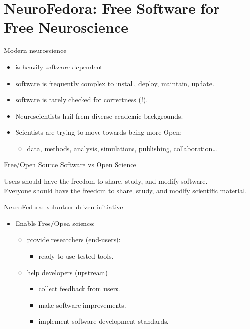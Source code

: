 \section{NeuroFedora: Free Software for Free Neuroscience}
\begin{frame}[c]{Modern neuroscience}
  \begin{itemize}
    \item is \alert{heavily software dependent}.
    \item software is frequently \alert{complex} to install, deploy, maintain, update.
    \item software is \alert{rarely checked for correctness (!)}.
      \pause{}
    \item Neuroscientists hail from \alert{diverse academic backgrounds}.
      \pause{}
    \item Scientists are trying to move towards being more \alert{Open}:
      \begin{itemize}
        \item data, methods, analysis, simulations, publishing, collaboration\ldots{}
      \end{itemize}
  \end{itemize}
\end{frame}
\begin{frame}[c]{Free/Open Source Software vs Open Science}
  \begin{center}
    Users should have the freedom to \alert{share, study, and modify} software\footnotemark[1].\\
    \vspace{1cm}
    \alert{Everyone} should have the freedom to \alert{share, study, and modify} scientific material\footnotemark[2].
  \end{center}
\end{frame}
\begin{frame}[c]{NeuroFedora: volunteer driven initiative}
  \begin{itemize}
    \item Enable \alert{Free/Open science}:
      \pause{}
      \begin{itemize}
        \item provide researchers (end-users):
          \begin{itemize}
            \item ready to use \alert{tested} tools.
          \end{itemize}
          \pause{}
        \item help developers (upstream)
          \begin{itemize}
            \item collect feedback from users.
            \item make software improvements.
            \item implement software development standards.
          \end{itemize}
      \end{itemize}
  \end{itemize}
\end{frame}
